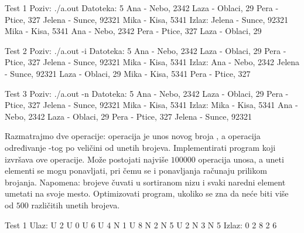 \begin{Exercise}[label=514]
\begin{miditest}
\begin{test}{Test 1}
Poziv: ./a.out
Datoteka:  5
           Ana - Nebo, 2342
           Laza - Oblaci, 29
           Pera - Ptice, 327
           Jelena - Sunce, 92321
           Mika - Kisa, 5341
Izlaz:     Jelena - Sunce, 92321
           Mika - Kisa, 5341
           Ana - Nebo, 2342
           Pera - Ptice, 327
           Laza - Oblaci, 29
\end{test}
\end{miditest}
\begin{miditest}
\begin{test}{Test 2}
Poziv: ./a.out -i
Datoteka:  5
           Ana - Nebo, 2342
           Laza - Oblaci, 29
           Pera - Ptice, 327
           Jelena - Sunce, 92321
           Mika - Kisa, 5341
Izlaz:     Ana - Nebo, 2342
           Jelena - Sunce, 92321
           Laza - Oblaci, 29
           Mika - Kisa, 5341
           Pera - Ptice, 327
\end{test}
\end{miditest}

\begin{miditest}
\begin{test}{Test 3}
Poziv: ./a.out -n
Datoteka:  5
           Ana - Nebo, 2342
           Laza - Oblaci, 29
           Pera - Ptice, 327
           Jelena - Sunce, 92321
           Mika - Kisa, 5341
Izlaz:     Mika - Kisa, 5341
           Ana - Nebo, 2342
           Laza - Oblaci, 29
           Pera - Ptice, 327
           Jelena - Sunce, 92321		   
\end{test}
\end{miditest}
\end{Exercise}
\begin{Answer}[ref=514]
\end{Answer}
\begin{Exercise}[difficulty=2, label=515]
  Razmatrajmo dve operacije: operacija  je unos novog broja
  , a operacija  određivanje -tog po
  veličini od unetih brojeva. Implementirati program koji izvršava ove
  operacije. Može postojati najviše $100000$ operacija unosa, a uneti
  elementi se mogu ponavljati, pri čemu se i ponavljanja računaju
  prilikom brojanja. Napomena: brojeve čuvati u sortiranom nizu i
  svaki naredni element umetati na svoje mesto. Optimizovati program,
  ukoliko se zna da neće biti više od $500$ različitih unetih brojeva.
  
\begin{maxitest}
\begin{test}{Test 1}
Ulaz: U 2 U 0 U 6 U 4 N 1 U 8 N 2 N 5 U 2 N 3 N 5
Izlaz: 0 2 8 2 6
\end{test}
\end{maxitest}
  
\end{Exercise}

